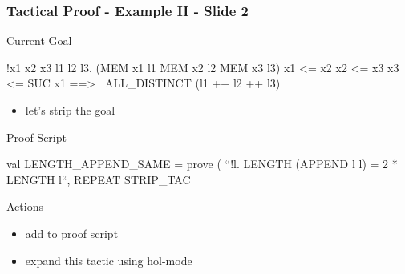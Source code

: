 \begin{frame}[fragile]
\frametitle{Tactical Proof - Example II - Slide 2}

\begin{block}{Current Goal}
\begin{semiverbatim}\small
!x1 x2 x3 l1 l2 l3.
  (MEM x1 l1 \holAnd{} MEM x2 l2 \holAnd{} MEM x3 l3) \holAnd{} 
  x1 <= x2 \holAnd{} x2 <= x3 \holAnd{} x3 <= SUC x1 ==>
  ~ALL_DISTINCT (l1 ++ l2 ++ l3)
\end{semiverbatim}
\end{block}

\begin{itemize}
\item let's strip the goal 
\end{itemize}

\begin{block}{Proof Script}
\begin{semiverbatim}\small
val LENGTH_APPEND_SAME = prove (
  ``!l. LENGTH (APPEND l l) = 2 * LENGTH l``,
REPEAT STRIP\_TAC
\end{semiverbatim}
\end{block}

\begin{block}{Actions}
\begin{itemize}
\item add  to proof script
\item expand this tactic using hol-mode
\end{itemize}
\end{block}
\end{frame}



